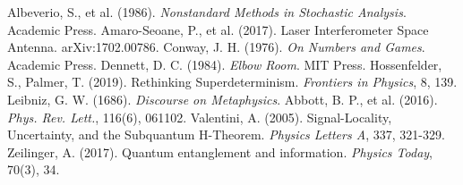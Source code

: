 \documentclass{article}
\begin{document}
\begin{thebibliography}{9}
 Albeverio, S., et al. (1986). \emph{Nonstandard Methods in Stochastic Analysis}. Academic Press.
 Amaro-Seoane, P., et al. (2017). Laser Interferometer Space Antenna. arXiv:1702.00786.
 Conway, J. H. (1976). \emph{On Numbers and Games}. Academic Press.
 Dennett, D. C. (1984). \emph{Elbow Room}. MIT Press.
 Hossenfelder, S., Palmer, T. (2019). Rethinking Superdeterminism. \emph{Frontiers in Physics}, 8, 139.
 Leibniz, G. W. (1686). \emph{Discourse on Metaphysics}.
 Abbott, B. P., et al. (2016). \emph{Phys. Rev. Lett.}, 116(6), 061102.
 Valentini, A. (2005). Signal-Locality, Uncertainty, and the Subquantum H-Theorem. \emph{Physics Letters A}, 337, 321-329.
 Zeilinger, A. (2017). Quantum entanglement and information. \emph{Physics Today}, 70(3), 34.
\end{thebibliography}
\end{document}
